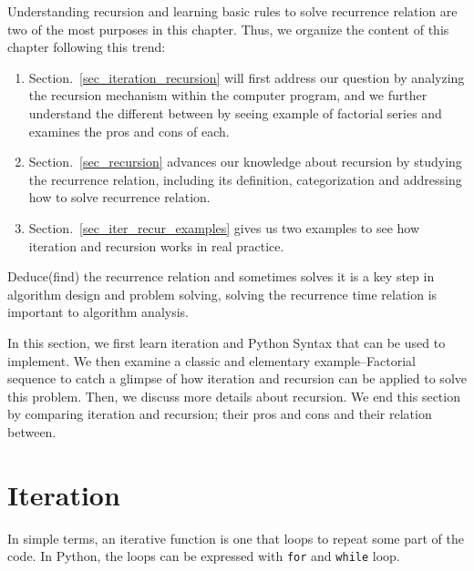 \documentclass[../main.tex]{subfiles}
\begin{document}
Understanding recursion and learning basic rules to solve recurrence relation are two of the most purposes in this chapter. Thus, we organize the content of this chapter following this trend:
\begin{enumerate}
    \item Section.~\ref{sec_iteration_recursion} will first address our question by analyzing the recursion mechanism within the computer program, and we further understand the different between by seeing example of factorial series and examines the pros and cons of each. 
    \item Section.~\ref{sec_recursion} advances our knowledge about recursion by studying the recurrence relation, including its definition, categorization and addressing how to solve recurrence relation. 
    \item Section.~\ref{sec_iter_recur_examples} gives us two examples to see how iteration and recursion works in real practice. 
\end{enumerate} 
\begin{importantnote}
Deduce(find) the recurrence relation and sometimes solves it is a key step in algorithm design and problem solving,  solving the recurrence time relation is important to  algorithm analysis. 
\end{importantnote}

In this section, we first learn iteration and Python Syntax that can be used to implement. We then examine a classic and elementary example--Factorial sequence to catch a glimpse of how iteration and recursion can be applied to solve this problem. Then, we discuss more details about recursion. We end this section by comparing iteration and recursion; their pros and cons and their relation between. 

\section{Iteration}
In simple terms, an iterative function is one that loops to repeat some part of the code. In Python, the loops can be expressed with \texttt{for} and \texttt{while} loop. 
\end{document}
